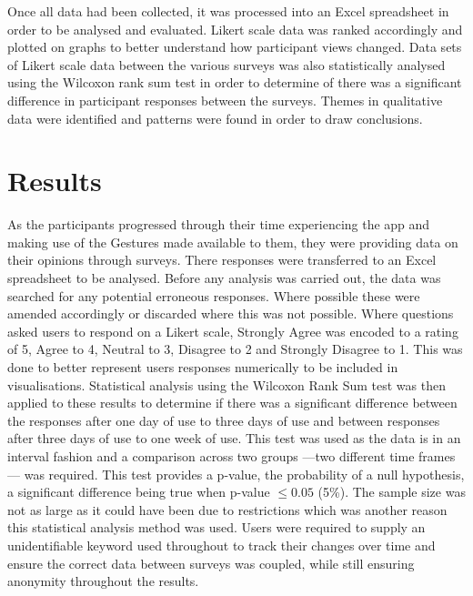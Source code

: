 \documentclass{l4proj}
\begin{document}
Once all data had been collected, it was processed into an Excel spreadsheet in order to be analysed and evaluated. Likert scale data was ranked accordingly and plotted on graphs to better understand how participant views changed. Data sets of Likert scale data between the various surveys was also statistically analysed using the Wilcoxon rank sum test in order to determine of there was a significant difference in participant responses between the surveys. Themes in qualitative data were identified and patterns were found in order to draw conclusions.

\section{Results} 

As the participants progressed through their time experiencing the app and making use of the Gestures made available to them, they were providing data on their opinions through surveys. There responses were transferred to an Excel spreadsheet to be analysed. Before any analysis was carried out, the data was searched for any potential erroneous responses. Where possible these were amended accordingly or discarded where this was not possible. Where questions asked users to respond on a Likert scale, Strongly Agree was encoded to a rating of 5, Agree to 4, Neutral to 3, Disagree to 2 and Strongly Disagree to 1. This was done to better represent users responses numerically to be included in visualisations. Statistical analysis using the Wilcoxon Rank Sum test was then applied to these results to determine if there was a significant difference between the responses after one day of use to three days of use and between responses after three days of use to one week of use. This test was used as the data is in an interval fashion and a comparison across two groups ---two different time frames--- was required. This test provides a p-value, the probability of a null hypothesis, a significant difference being true when p-value $\leq{0.05}$ (5\%). The sample size was not as large as it could have been due to restrictions which was another reason this statistical analysis method was used. Users were required to supply an unidentifiable keyword used throughout to track their changes over time and ensure the correct data between surveys was coupled, while still ensuring anonymity throughout the results. 
\end{document}
